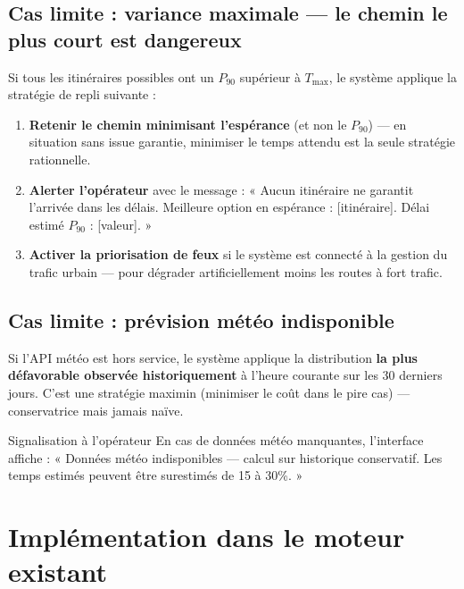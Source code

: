 \documentclass[12pt,a4paper]{article}
\theoremstyle{definition}
\theoremstyle{remark}
\begin{document}
\subsection{Cas limite : variance maximale — le chemin le plus court est dangereux}

Si tous les itinéraires possibles ont un $P_{90}$ supérieur à
$T_{\max}$, le système applique la stratégie de repli suivante :

\begin{enumerate}[leftmargin=2em, itemsep=4pt]
  \item \textbf{Retenir le chemin minimisant l'espérance} (et non
    le $P_{90}$) — en situation sans issue garantie, minimiser le
    temps attendu est la seule stratégie rationnelle.
  \item \textbf{Alerter l'opérateur} avec le message :
    « Aucun itinéraire ne garantit l'arrivée dans les délais.
    Meilleure option en espérance : [itinéraire]. Délai estimé $P_{90}$ : [valeur]. »
  \item \textbf{Activer la priorisation de feux} si le système est
    connecté à la gestion du trafic urbain — pour dégrader artificiellement
    moins les routes à fort trafic.
\end{enumerate}

\subsection{Cas limite : prévision météo indisponible}

Si l'API météo est hors service, le système applique la distribution
\textbf{la plus défavorable observée historiquement} à l'heure courante
sur les 30 derniers jours. C'est une stratégie maximin (minimiser le
coût dans le pire cas) — conservatrice mais jamais naïve.

\begin{alertbox}{Signalisation à l'opérateur}
En cas de données météo manquantes, l'interface affiche :
« Données météo indisponibles — calcul sur historique conservatif.
Les temps estimés peuvent être surestimés de 15 à 30\%. »
\end{alertbox}

\newpage

\section{Implémentation dans le moteur existant}
\end{document}
